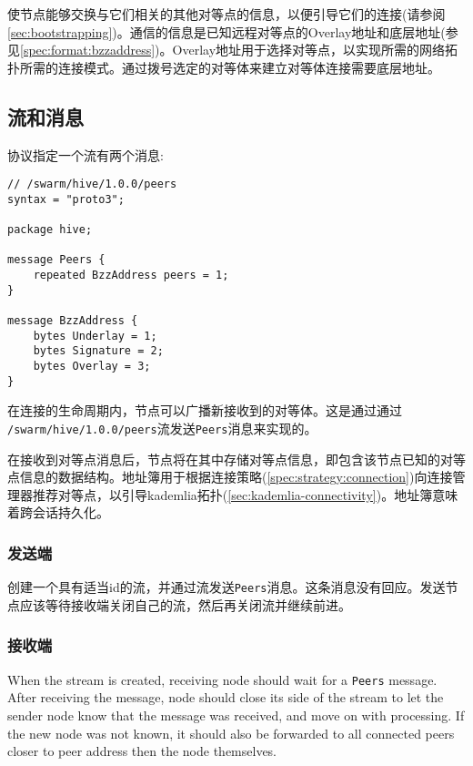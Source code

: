使节点能够交换与它们相关的其他对等点的信息，以便引导它们的连接(请参阅\ref{sec:bootstrapping})。通信的信息是已知远程对等点的Overlay地址和底层地址(参见\ref{spec:format:bzzaddress})。Overlay地址用于选择对等点，以实现所需的网络拓扑所需的连接模式。通过拨号选定的对等体来建立对等体连接需要底层地址。

\subsection{流和消息\statusgreen}


协议指定一个流有两个消息:

\begin{definition}\label{def:hive-messages}

\begin{lstlisting}
// /swarm/hive/1.0.0/peers
syntax = "proto3";

package hive;

message Peers {
    repeated BzzAddress peers = 1;
}

message BzzAddress {
    bytes Underlay = 1;
    bytes Signature = 2;
    bytes Overlay = 3;
}

\end{lstlisting}
\end{definition}

在连接的生命周期内，节点可以广播新接收到的对等体。这是通过通过\\\lstinline{/swarm/hive/1.0.0/peers}流发送\lstinline{Peers}消息来实现的。

在接收到对等点消息后，节点将在其中存储对等点信息，即包含该节点已知的对等点信息的数据结构。地址簿用于根据连接策略(\ref{spec:strategy:connection})向连接管理器推荐对等点，以引导kademlia拓扑(\ref{sec:kademlia-connectivity})。地址簿意味着跨会话持久化。

\subsubsection{发送端}

创建一个具有适当id的流，并通过流发送\lstinline{Peers}消息。这条消息没有回应。发送节点应该等待接收端关闭自己的流，然后再关闭流并继续前进。

\subsubsection{接收端}

When the stream is created, receiving node should wait for a \lstinline{Peers} message. After receiving the message, node should close its side of the stream to let the sender node know that the message was received, and move on with processing. If the new node was not known, it should also be forwarded to all connected peers closer to peer address then the node themselves.